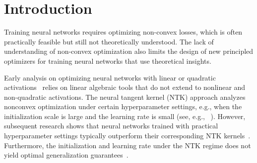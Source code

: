 

\newcommand{\tnote}[1]{\TM{ [#1] }}

\section{Introduction} \label{sec:intro}
Training neural networks requires optimizing non-convex losses, which is often practically feasible but still not theoretically understood. The lack of understanding of non-convex optimization also limits the design of new principled optimizers for training neural networks that use theoretical insights. 

Early analysis on optimizing neural networks with linear or quadratic activations~\citep{du2018power, gunasekar2018implicit, li2018algorithmic,gunasekar2018characterizing,soltanolkotabi2018theoretical,hardt2016identity,kawaguchi2016deep,hardt2018gradient,oymak2020toward} relies on linear algebraic tools that do not extend to nonlinear and non-quadratic activations. The neural tangent kernel (NTK) approach analyzes nonconvex optimization under certain hyperparameter settings, e.g., when the initialization scale is large and the learning rate is small (see, e.g., ~\citet{du2018gradient,jacot2018neural, li2018learning, arora2019fine, daniely2016toward}). 
However, subsequent research shows that neural networks trained with practical hyperparameter settings typically outperform their corresponding NTK kernels~\citep{arora2019exact}. Furthermore, the initialization and learning rate under the NTK regime does not yield optimal generalization guarantees~\citep {wei2019regularization,chizat2018note,woodworth2020kernel, ghorbani2020neural}. 

